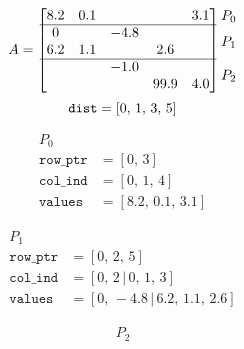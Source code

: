 \documentclass{article}
\begin{document}
\begin{figure}
  \begin{center}
    \begin{equation*}
      A = \begin{bmatrix}
        8.2 & 0.1 & & & 3.1 \\
        \hline
        0 &  & -4.8 \\
        6.2 & 1.1 &  & 2.6 \\
        \hline
        & & -1.0 &  &  \\
        & & & 99.9 & 4.0
      \end{bmatrix}
      \begin{matrix}  P_0 \\ \vspace{-.2cm} \\ P_1 \\  \\ P_2 \vspace{.2cm}\end{matrix}
    \end{equation*}
    \begin{equation*}
      \texttt{dist} = [ 0, \, 1, \, 3, \, 5 ]
      \vspace{-.5cm}
    \end{equation*}
    \begin{minipage}{.3\textwidth}
      \begin{align*}
        P_0 \\
        \texttt{row\_ptr} &= [ 0, \, 3 ] \\
        \texttt{col\_ind} &= [ 0, \, 1,   \, 4 ] \\
        \texttt{values}   &= [ 8.2, \, 0.1, \, 3.1 ]
      \end{align*}
    \end{minipage}
    \begin{minipage}{.3\textwidth}
      \begin{align*}
        P_1 \\
        \texttt{row\_ptr} &= [ 0, \, 2, \, 5 ] \\
        \texttt{col\_ind} &= [ 0, \, 2  \,| \, 0, \, 1, \, 3 ] \\
        \texttt{values}   &= [ 0, \, -4.8 \,| \, 6.2, \, 1.1, \, 2.6 ]
      \end{align*}
    \end{minipage}
    \begin{minipage}{.3\textwidth}
      \begin{align*}
        P_2 \\

\end{align*}
\end{minipage}
\end{center}
\end{figure}
\end{document}
